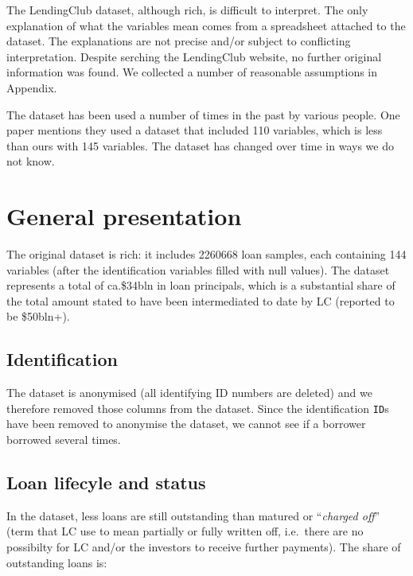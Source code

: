 \documentclass[11pt,]{report}
\begin{document}
The LendingClub dataset, although rich, is difficult to interpret. The only explanation of what the variables mean comes from a spreadsheet attached to the dataset. The explanations are not precise and/or subject to conflicting interpretation. Despite serching the LendingClub website, no further original information was found. We collected a number of reasonable assumptions in Appendix.

The dataset has been used a number of times in the past by various people. One paper \citep{kim2019ensemble} mentions they used a dataset that included 110 variables, which is less than ours with 145 variables. The dataset has changed over time in ways we do not know.

\hypertarget{general-presentation}{%
\section{General presentation}\label{general-presentation}}

The original dataset is rich: it includes 2260668 loan samples, each containing 144 variables (after the identification variables filled with null values). The dataset represents a total of ca.\$34bln in loan principals, which is a substantial share of the total amount stated to have been intermediated to date by LC (reported to be \$50bln+).

\hypertarget{identification}{%
\subsection{Identification}\label{identification}}

The dataset is anonymised (all identifying ID numbers are deleted) and we therefore removed those columns from the dataset. Since the identification \texttt{ID}s have been removed to anonymise the dataset, we cannot see if a borrower borrowed several times.

\hypertarget{loan-lifecyle-and-status}{%
\subsection{Loan lifecyle and status}\label{loan-lifecyle-and-status}}

In the dataset, less loans are still outstanding than matured or ``\emph{charged off}'' (term that LC use to mean partially or fully written off, i.e.~there are no possibilty for LC and/or the investors to receive further payments). The share of outstanding loans is:
\end{document}

